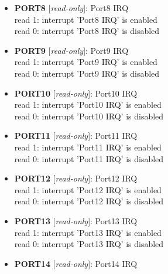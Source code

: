 \begin{itemize}
\begin{small}
{\bf 
PORT7
} [\emph{read-only}]: Port7 IRQ
\\
read 1: interrupt 'Port7 IRQ' is enabled\\read 0: interrupt 'Port7 IRQ' is disabled
\end{small}
\item \begin{small}
{\bf 
PORT8
} [\emph{read-only}]: Port8 IRQ
\\
read 1: interrupt 'Port8 IRQ' is enabled\\read 0: interrupt 'Port8 IRQ' is disabled
\end{small}
\item \begin{small}
{\bf 
PORT9
} [\emph{read-only}]: Port9 IRQ
\\
read 1: interrupt 'Port9 IRQ' is enabled\\read 0: interrupt 'Port9 IRQ' is disabled
\end{small}
\item \begin{small}
{\bf 
PORT10
} [\emph{read-only}]: Port10 IRQ
\\
read 1: interrupt 'Port10 IRQ' is enabled\\read 0: interrupt 'Port10 IRQ' is disabled
\end{small}
\item \begin{small}
{\bf 
PORT11
} [\emph{read-only}]: Port11 IRQ
\\
read 1: interrupt 'Port11 IRQ' is enabled\\read 0: interrupt 'Port11 IRQ' is disabled
\end{small}
\item \begin{small}
{\bf 
PORT12
} [\emph{read-only}]: Port12 IRQ
\\
read 1: interrupt 'Port12 IRQ' is enabled\\read 0: interrupt 'Port12 IRQ' is disabled
\end{small}
\item \begin{small}
{\bf 
PORT13
} [\emph{read-only}]: Port13 IRQ
\\
read 1: interrupt 'Port13 IRQ' is enabled\\read 0: interrupt 'Port13 IRQ' is disabled
\end{small}
\item \begin{small}
{\bf 
PORT14
} [\emph{read-only}]: Port14 IRQ

\end{small}
\end{itemize}
